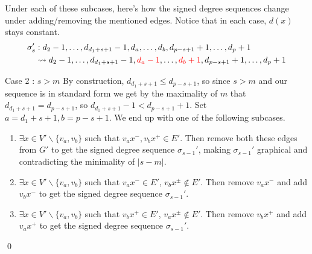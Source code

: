 \begin{frame}
	Under each of these subcases, here's how the signed degree sequences change under adding/removing the mentioned edges. Notice that in each case, $d(x)$ stays constant.
	\begin{align*}
		\sigma^\prime_s&: d_2-1, \dots, d_{d_1+s+1}-1, d_{a}, \dots, d_{b}, d_{p-s+1}+1, \dots, d_p+1 \\
			& \leadsto d_2-1, \dots, d_{d_1+s+1}-1, \color{red} d_{a} - 1 \color{black}, \dots, \color{red} d_{b} + 1 \color{black}, d_{p-s+1}+1, \dots, d_p+1
	\end{align*}
\end{frame}


\begin{frame}{Case 2 : $s > m$}
	By construction, $d_{d_1+s+1} \leq d_{p-s+1}$, so since $s > m$ and our sequence is in standard form we get by the maximality of $m$ that $d_{d_1+s+1} = d_{p-s+1}$, so $d_{d_1+s+1}-1 < d_{p-s+1}+1$. Set $a = d_1+s+1, b = p-s+1$. We end up with one of the following subcases.
	\begin{enumerate}
		\item $\exists x \in V'\backslash\{v_a,v_b\}$ such that $v_ax^{-}, v_bx^{+} \in E'$. Then remove both these edges from $G'$ to get the signed degree sequence $\sigma_{s-1}'$, making $\sigma_{s-1}'$ graphical and contradicting the minimality of $|s - m|$.
		\item $\exists x \in V'\backslash\{v_a,v_b\}$ such that $v_ax^{-} \in E'$, $v_bx^{\pm} \notin E'$. Then remove $v_ax^{-}$ and add $v_bx^{-}$ to get the signed degree sequence $\sigma_{s-1}'$.
		\item $\exists x \in V'\backslash\{v_a,v_b\}$ such that $v_bx^{+} \in E'$, $v_ax^{\pm} \notin E'$. Then remove $v_bx^{+}$ and add $v_ax^{+}$ to get the signed degree sequence $\sigma_{s-1}'$.
	\end{enumerate}  \qed
\end{frame}
